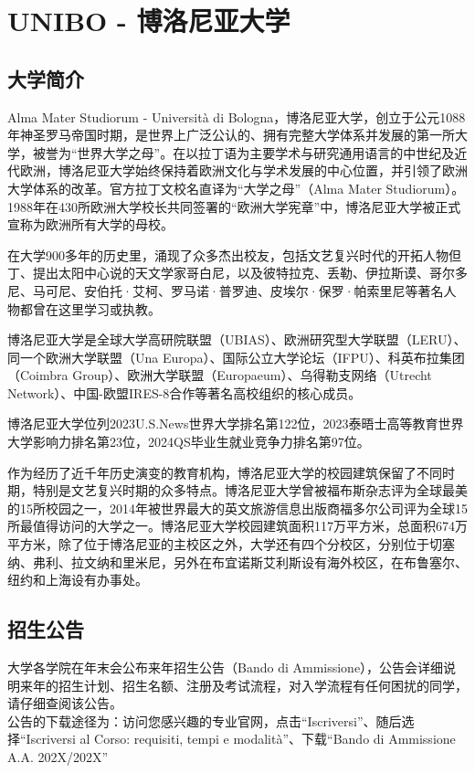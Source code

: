\chapter{UNIBO - 博洛尼亚大学}    

\section{大学简介}
Alma Mater Studiorum - Università di Bologna，博洛尼亚大学，创立于公元1088年神圣罗马帝国时期，是世界上广泛公认的、拥有完整大学体系并发展的第一所大学，被誉为“世界大学之母”。在以拉丁语为主要学术与研究通用语言的中世纪及近代欧洲，博洛尼亚大学始终保持着欧洲文化与学术发展的中心位置，并引领了欧洲大学体系的改革。官方拉丁文校名直译为“大学之母”（Alma Mater Studiorum）。1988年在430所欧洲大学校长共同签署的“欧洲大学宪章”中，博洛尼亚大学被正式宣称为欧洲所有大学的母校。

在大学900多年的历史里，涌现了众多杰出校友，包括文艺复兴时代的开拓人物但丁、提出太阳中心说的天文学家哥白尼，以及彼特拉克、丢勒、伊拉斯谟、哥尔多尼、马可尼、安伯托·艾柯、罗马诺·普罗迪、皮埃尔·保罗·帕索里尼等著名人物都曾在这里学习或执教。
 
博洛尼亚大学是全球大学高研院联盟（UBIAS）、欧洲研究型大学联盟（LERU）、同一个欧洲大学联盟（Una Europa）、国际公立大学论坛（IFPU）、科英布拉集团（Coimbra Group）、欧洲大学联盟（Europaeum）、乌得勒支网络（Utrecht Network）、中国-欧盟IRES-8合作等著名高校组织的核心成员。

博洛尼亚大学位列2023U.S.News世界大学排名第122位，2023泰晤士高等教育世界大学影响力排名第23位，2024QS毕业生就业竞争力排名第97位。

作为经历了近千年历史演变的教育机构，博洛尼亚大学的校园建筑保留了不同时期，特别是文艺复兴时期的众多特点。博洛尼亚大学曾被福布斯杂志评为全球最美的15所校园之一，2014年被世界最大的英文旅游信息出版商福多尔公司评为全球15所最值得访问的大学之一。博洛尼亚大学校园建筑面积117万平方米，总面积674万平方米，除了位于博洛尼亚的主校区之外，大学还有四个分校区，分别位于切塞纳、弗利、拉文纳和里米尼，另外在布宜诺斯艾利斯设有海外校区，在布鲁塞尔、纽约和上海设有办事处。

\section{招生公告}        

大学各学院在年末会公布来年招生公告（Bando di Ammissione），公告会详细说明来年的招生计划、招生名额、注册及考试流程，对入学流程有任何困扰的同学，请仔细查阅该公告。\\
公告的下载途径为：访问您感兴趣的专业官网，点击“Iscriversi”、随后选择“Iscriversi al Corso: requisiti, tempi e modalità”、下载“Bando di Ammissione A.A. 202X/202X”

